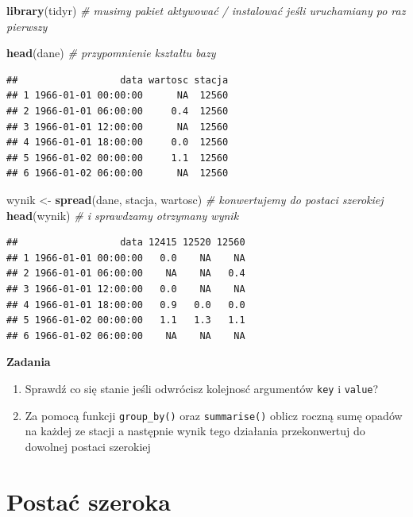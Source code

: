 \documentclass[]{book}
\newenvironment{Shaded}{\begin{snugshade}}{\end{snugshade}}
\newcommand{\KeywordTok}[1]{\textcolor[rgb]{0.13,0.29,0.53}{\textbf{#1}}}
\newcommand{\StringTok}[1]{\textcolor[rgb]{0.31,0.60,0.02}{#1}}
\newcommand{\CommentTok}[1]{\textcolor[rgb]{0.56,0.35,0.01}{\textit{#1}}}
\newcommand{\NormalTok}[1]{#1}
\providecommand{\tightlist}{%
  \setlength{\itemsep}{0pt}\setlength{\parskip}{0pt}}
\theoremstyle{definition}
\theoremstyle{definition}
\theoremstyle{definition}
\theoremstyle{remark}
\begin{document}
\begin{Shaded}
\begin{Highlighting}[]
\KeywordTok{library}\NormalTok{(tidyr) }\CommentTok{# musimy pakiet aktywować / instalować jeśli uruchamiany po raz pierwszy}

\KeywordTok{head}\NormalTok{(dane) }\CommentTok{# przypomnienie kształtu bazy}
\end{Highlighting}
\end{Shaded}

\begin{verbatim}
##                  data wartosc stacja
## 1 1966-01-01 00:00:00      NA  12560
## 2 1966-01-01 06:00:00     0.4  12560
## 3 1966-01-01 12:00:00      NA  12560
## 4 1966-01-01 18:00:00     0.0  12560
## 5 1966-01-02 00:00:00     1.1  12560
## 6 1966-01-02 06:00:00      NA  12560
\end{verbatim}

\begin{Shaded}
\begin{Highlighting}[]
\NormalTok{wynik <-}\StringTok{ }\KeywordTok{spread}\NormalTok{(dane, stacja, wartosc) }\CommentTok{# konwertujemy do postaci szerokiej}
\KeywordTok{head}\NormalTok{(wynik) }\CommentTok{# i sprawdzamy otrzymany wynik}
\end{Highlighting}
\end{Shaded}

\begin{verbatim}
##                  data 12415 12520 12560
## 1 1966-01-01 00:00:00   0.0    NA    NA
## 2 1966-01-01 06:00:00    NA    NA   0.4
## 3 1966-01-01 12:00:00   0.0    NA    NA
## 4 1966-01-01 18:00:00   0.9   0.0   0.0
## 5 1966-01-02 00:00:00   1.1   1.3   1.1
## 6 1966-01-02 06:00:00    NA    NA    NA
\end{verbatim}

\textbf{Zadania}

\begin{enumerate}
\def\labelenumi{\arabic{enumi}.}
\tightlist
\item
  Sprawdź co się stanie jeśli odwrócisz kolejnosć argumentów
  \texttt{key} i \texttt{value}?
\item
  Za pomocą funkcji \texttt{group\_by()} oraz \texttt{summarise()}
  oblicz roczną sumę opadów na każdej ze stacji a następnie wynik tego
  działania przekonwertuj do dowolnej postaci szerokiej
\end{enumerate}

\section{Postać szeroka}\label{postac-szeroka}
\end{document}

